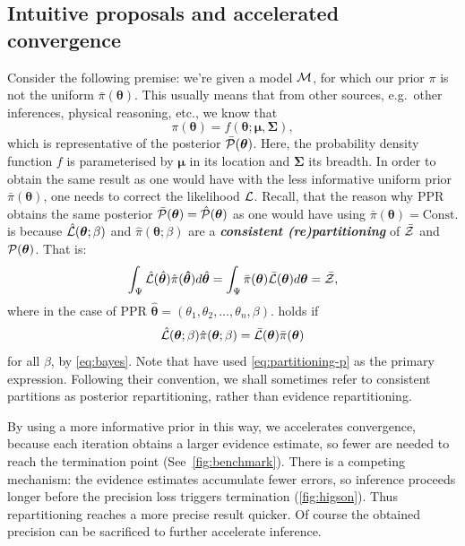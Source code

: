 \documentclass[usenatbib]{mnras}
\begin{document}
\subsection{Intuitive proposals and accelerated convergence\label{sec:accelerating}}
Consider the following premise: we're given a model \({\cal M}\), for
which our prior $\pi$ is not the uniform
\(\bar{\pi}(\bm{\theta})\). This usually means that from other
sources, e.g.~other inferences, physical reasoning, etc., we know that
\begin{equation}
  \pi (\bm{\theta}) = f(\bm{\theta}; \bm{\mu}, \bm{\Sigma}),
 \label{eq:bias}
\end{equation}
which is representative of the posterior
\(\bar{\cal P}(\bm{\theta})\). Here, the probability density function
$f$ is parameterised by \(\bm{\mu}\) in its location and
\(\bm{\Sigma}\) its breadth. In order to obtain the same result as one
would have with the less informative uniform prior
\(\bar{\pi}(\bm{\theta})\), one needs to correct the likelihood
${\cal L}$. Recall, that the reason why PPR obtains the same posterior
\( \bar{\cal P}(\bm{\theta})= \hat{\cal P}(\bm{\theta})\) as one would
have using \( \bar{\pi} (\bm{\theta}) = \text{Const.}\) is because
\( \hat{\cal L} (\bm{\theta};\beta)\) and
\( \hat{\pi} (\bm{\theta};\beta)\) are a \textbf{\emph{consistent
    (re)partitioning}} of \( \bar{\cal Z}\) and
\({\cal P}(\bm{\theta})\). That is:
\begin{equation}
  \label{eq:partitioning}
  \int_{\Psi} \hat{\cal L} (\hat{\bm{\theta}}) \hat{\pi} (\bm{\hat{\theta}}) d\hat{\bm{\theta}}  = \int_{\Psi}\bar{\pi} (\bm{\theta}) \bar{\cal L} (\bm{\theta}) d\bm{\theta} = \bar{\cal Z}, 
\end{equation}
where in the case of PPR
$\hat{\bm{\theta}} = (\theta_{1}, \theta_{2}, \ldots, \theta_{n},
\beta)$.  holds if
\begin{equation}
  \label{eq:partitioning-p}
  \hat{\cal L}(\bm{\theta};\beta) \hat{\pi}(\bm{\theta};\beta)  = \bar{\cal L}(\bm{\theta})\bar{\pi}(\bm{\theta}) 
\end{equation}
for all $\beta$, by \cref{eq:bayes}. Note that
\cite{chen-ferroz-hobson} have used \cref{eq:partitioning-p} as the
primary expression. Following their convention, we shall sometimes
refer to consistent partitions as posterior repartitioning, rather
than evidence repartitioning.

By using a more informative prior in this way, we accelerates
convergence, because each iteration obtains a larger evidence
estimate, so fewer are needed to reach the termination point
(See~\cref{fig:benchmark}). There is a competing mechanism: the
evidence estimates accumulate fewer errors, so inference proceeds
longer before the precision loss triggers termination
(\cref{fig:higson}). Thus repartitioning reaches a more precise result
quicker. Of course the obtained precision can be sacrificed to further
accelerate inference. 
\end{document}
